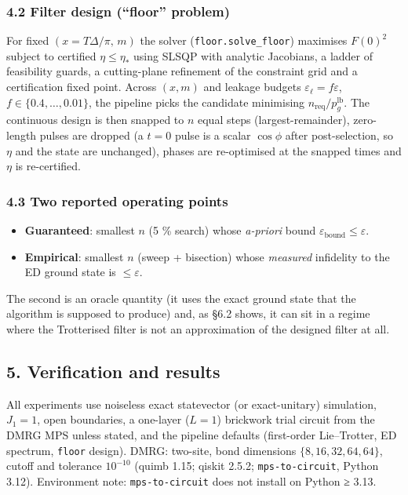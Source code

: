 \documentclass[
]{article}
\providecommand{\tightlist}{%
  \setlength{\itemsep}{0pt}\setlength{\parskip}{0pt}}
\begin{document}
\hypertarget{filter-design-floor-problem}{%
\subsubsection{4.2 Filter design (``floor''
problem)}\label{filter-design-floor-problem}}

For fixed \((x{=}T\Delta/\pi,\,m)\) the solver
(\texttt{floor.solve\_floor}) maximises \(F(0)^2\) subject to certified
\(\eta\le\eta_*\) using SLSQP with analytic Jacobians, a ladder of
feasibility guards, a cutting-plane refinement of the constraint grid
and a certification fixed point. Across \((x,m)\) and leakage budgets
\(\varepsilon_\ell=f\varepsilon\), \(f\in\{0.4,\dots,0.01\}\), the
pipeline picks the candidate minimising
\(n_{\mathrm{req}}/p_{g}^{\mathrm{lb}}\). The continuous design is then
snapped to \(n\) equal steps (largest-remainder), zero-length pulses are
dropped (a \(t=0\) pulse is a scalar \(\cos\phi\) after post-selection,
so \(\eta\) and the state are unchanged), phases are re-optimised at the
snapped times and \(\eta\) is re-certified.

\hypertarget{two-reported-operating-points}{%
\subsubsection{4.3 Two reported operating
points}\label{two-reported-operating-points}}

\begin{itemize}
\tightlist
\item
  \textbf{Guaranteed}: smallest \(n\) (5 \% search) whose
  \emph{a-priori} bound \(\varepsilon_{\mathrm{bound}}\le\varepsilon\).
\item
  \textbf{Empirical}: smallest \(n\) (sweep + bisection) whose
  \emph{measured} infidelity to the ED ground state is
  \(\le\varepsilon\).
\end{itemize}

The second is an oracle quantity (it uses the exact ground state that
the algorithm is supposed to produce) and, as §6.2 shows, it can sit in
a regime where the Trotterised filter is not an approximation of the
designed filter at all.

\hypertarget{verification-and-results}{%
\subsection{5. Verification and
results}\label{verification-and-results}}

All experiments use noiseless exact statevector (or exact-unitary)
simulation, \(J_1=1\), open boundaries, a one-layer (\(L=1\)) brickwork
trial circuit from the DMRG MPS unless stated, and the pipeline defaults
(first-order Lie--Trotter, ED spectrum, \texttt{floor} design). DMRG:
two-site, bond dimensions \(\{8,16,32,64,64\}\), cutoff and tolerance
\(10^{-10}\) (quimb 1.15; qiskit 2.5.2; \texttt{mps-to-circuit}, Python
3.12). Environment note: \texttt{mps-to-circuit} does not install on
Python ≥ 3.13.
\end{document}

